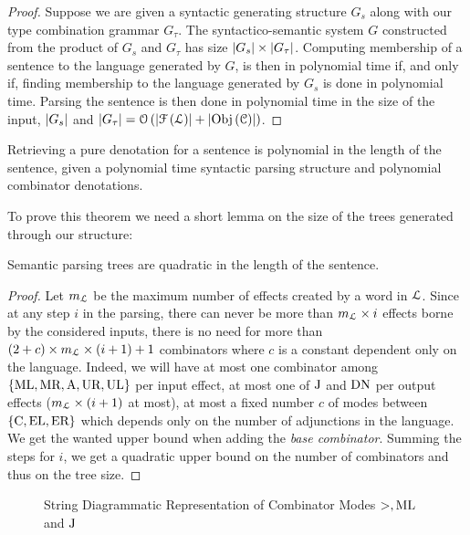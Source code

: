 \begin{proof}
	Suppose we are given a syntactic generating structure $G_{s}$ along with our
	type combination grammar $G_{\tau}$.
	The syntactico-semantic system $G$ constructed from the product of $G_{s}$ and
	$G_{\tau}$ has size $\left|G_{s}\right|\times \left|G_{\tau}\right|$.
	Computing membership of a sentence to the language generated by $G$, is then
	in polynomial time if, and only if, finding membership to the language
	generated by $G_{s}$ is done in polynomial time.
	Parsing the sentence is then done in polynomial time in the size of the
	input, $\left|G_{s}\right|$ and
	$\left|G_{\tau}\right| = \mathcal{O}\left(\left|\mathcal{F}\left(\mathcal{L}\right)\right| + \left|\operatorname{Obj}\left(\mathcal{C}\right)\right|\right)$.
\end{proof}

\begin{theorem}
	\label{thm:ptime-denot}
	Retrieving a pure denotation for a sentence is polynomial in
	the length of the sentence, given a polynomial time syntactic parsing
	structure and polynomial combinator denotations.
\end{theorem}

\noindent To prove this theorem we need a short lemma on the size of the trees generated
through our structure:
\begin{lemma}
	\label{lem:quad-tree}
	Semantic parsing trees are quadratic in the length of the sentence.
\end{lemma}

\begin{proof}
	Let $m_{\mathcal{L}}$ be the maximum number of effects created by a word in $\mathcal{L}$.
	Since at any step $i$ in the parsing, there can never be more than
	$m_{\mathcal{L}}\times i$ effects borne by the considered inputs, there is no need
	for more than $(2 + c) \times m_{\mathcal{L}}\times (i + 1) + 1$ combinators where
	$c$ is a constant dependent only on the language.
	Indeed, we will have at most one combinator among
	$\{\text{ML}, \text{MR}, \text{A}, \text{UR}, \text{UL}\}$ per input effect, at most one
	of $\text{J}$ and $\text{DN}$ per output effects
	($m_{\mathcal{L}} \times (i + 1)$ at most),	at most a fixed number $c$ of modes
	between $\{\text{C}, \text{EL}, \text{ER}\}$ which depends only on the number of
	adjunctions in the language.
	We get the wanted upper bound when adding the \emph{base combinator}.
	Summing the steps for $i$, we get a quadratic upper bound on the number of
	combinators and thus on the tree size.
\end{proof}

\begin{figure}
	\centering
	
	\caption{String Diagrammatic Representation of Combinator Modes $>, \text{ML}$ and $\text{J}$}
	\label{fig:combinator-sd}
\end{figure}

